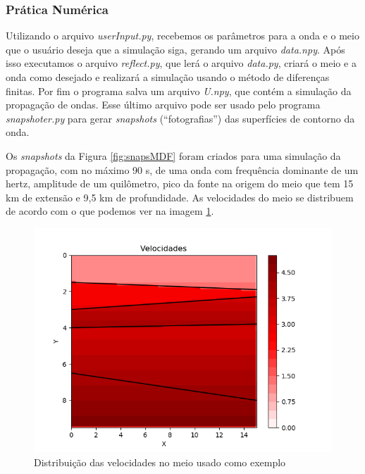             \subsubsection{Prática Numérica}
            
                Utilizando o arquivo \textit{userInput.py}, recebemos os parâmetros para a onda e o meio que o usuário deseja que a simulação siga, gerando um arquivo \textit{data.npy}. Após isso executamos o arquivo \textit{reflect.py}, que lerá o arquivo \textit{data.py}, criará o meio e a onda como desejado e realizará a simulação usando o método de diferenças finitas. Por fim o programa salva um arquivo \textit{U.npy}, que contém a simulação da propagação de ondas. Esse último arquivo pode ser usado pelo programa \textit{snapshoter.py} para gerar \textit{snapshots} (``fotografias'') das superfícies de contorno da onda.
                
                Os \textit{snapshots} da Figura \ref{fig:snapsMDF} foram criados para uma simulação da propagação, com no máximo 90 s, de uma onda com frequência dominante de um hertz, amplitude de um quilômetro, pico da fonte na origem do meio que tem 15 km de extensão e 9,5 km de profundidade. As velocidades do meio se distribuem de acordo com o que podemos ver na imagem \ref{fig:velDist}.
                
                \begin{figure}[H]
                    \centering    \includegraphics[scale=.8]{imagens/FDMimages/Velocidades.png}
                    \caption{Distribuição das velocidades no meio usado como exemplo}
                    \label{fig:velDist}
                \end{figure}
                
